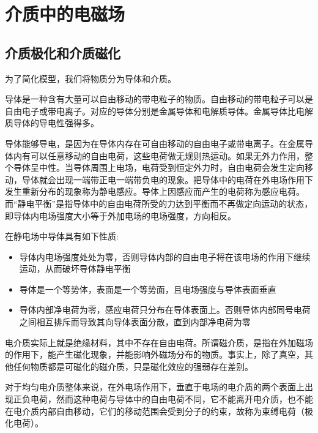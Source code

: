 \documentclass[UTF8,a4paper,11pt]{article}
\begin{document}
\section{介质中的电磁场}
\subsection{介质极化和介质磁化}
为了简化模型，我们将物质分为导体和介质。

导体是一种含有大量可以自由移动的带电粒子的物质。自由移动的带电粒子可以是自由电子或带电离子。对应的导体分别是金属导体和电解质导体。金属导体比电解质导体的导电性强得多。

导体能够导电，是因为在导体内存在可自由移动的自由电子或带电离子。在金属导体内有可以任意移动的自由电荷，这些电荷做无规则热运动。如果无外力作用，整个导体呈中性。当导体周围上电场，电荷受到恒定外力时，自由电荷会发生定向移动，导体就会出现一端带正电一端带负电的现象。把导体中的电荷在外电场作用下发生重新分布的现象称为静电感应。导体上因感应而产生的电荷称为感应电荷。而“静电平衡”是指导体中的自由电荷所受的力达到平衡而不再做定向运动的状态，即导体内电场强度大小等于外加电场的电场强度，方向相反。

在静电场中导体具有如下性质:
\begin{itemize}
\item 导体内电场强度处处为零，否则导体内部的自由电子将在该电场的作用下继续运动，从而破坏导体静电平衡
\item 导体是一个等势体，表面是一个等势面，且电场强度与导体表面垂直
\item 导体内部净电荷为零，感应电荷只分布在导体表面上。否则导体内部同号电荷之间相互排斥而导致其向导体表面分散，直到内部净电荷为零
\end{itemize}

电介质实际上就是绝缘材料，其中不存在自由电荷。所谓磁介质，是指在外加磁场的作用下，能产生磁化现象，并能影响外磁场分布的物质。事实上，除了真空，其他任何物质都是可磁化的磁介质，只是磁化效应的强弱存在差别。

对于均匀电介质整体来说，在外电场作用下，垂直于电场的电介质的两个表面上出现正负电荷，然而这种电荷与导体中的自由电荷不同，它不能离开电介质，也不能在电介质内部自由移动，它们的移动范围会受到分子的约束，故称为束缚电荷（极化电荷）。
\end{document}
